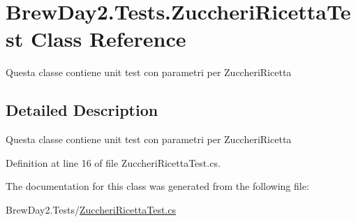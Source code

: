 \hypertarget{class_brew_day2_1_1_tests_1_1_zuccheri_ricetta_test}{}\section{Brew\+Day2.\+Tests.\+Zuccheri\+Ricetta\+Test Class Reference}
\label{class_brew_day2_1_1_tests_1_1_zuccheri_ricetta_test}


Questa classe contiene unit test con parametri per Zuccheri\+Ricetta 




\subsection{Detailed Description}
Questa classe contiene unit test con parametri per Zuccheri\+Ricetta



Definition at line 16 of file Zuccheri\+Ricetta\+Test.\+cs.



The documentation for this class was generated from the following file\+:\begin{DoxyCompactItemize}
\item 
Brew\+Day2.\+Tests/\mbox{\hyperlink{_zuccheri_ricetta_test_8cs}{Zuccheri\+Ricetta\+Test.\+cs}}\end{DoxyCompactItemize}
